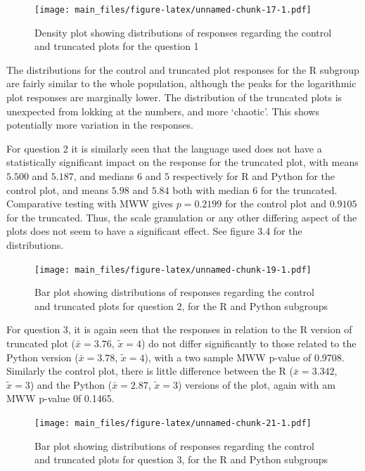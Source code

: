 \documentclass[
  11pt,
]{book}
\begin{document}
\begin{figure}
\centering
\texttt{[image: main\_files/figure-latex/unnamed-chunk-17-1.pdf]}
\caption{Density plot showing distributions of responses regarding the
control and truncated plots for the question 1}
\end{figure}

The distributions for the control and truncated plot responses for the R
subgroup are fairly similar to the whole population, although the peaks
for the logarithmic plot responses are marginally lower. The
distribution of the truncated plots is unexpected from lokking at the
numbers, and more `chaotic'. This shows potentially more variation in
the responses.

For question 2 it is similarly seen that the language used does not have
a statistically significant impact on the response for the truncated
plot, with means \(5.500\) and \(5.187\), and medians \(6\) and \(5\)
respectively for R and Python for the control plot, and means \(5.98\)
and \(5.84\) both with median \(6\) for the truncated. Comparative
testing with MWW gives \(p=0.2199\) for the control plot and \(0.9105\)
for the truncated. Thus, the scale granulation or any other differing
aspect of the plots does not seem to have a significant effect. See
figure 3.4 for the distributions.

\begin{figure}
\centering
\texttt{[image: main\_files/figure-latex/unnamed-chunk-19-1.pdf]}
\caption{Bar plot showing distributions of responses regarding the
control and truncated plots for question 2, for the R and Python
subgroups}
\end{figure}

For question 3, it is again seen that the responses in relation to the R
version of truncated plot (\(\bar{x} = 3.76\), \(\tilde{x} = 4\)) do not
differ significantly to those related to the Python version
(\(\bar{x} = 3.78\), \(\tilde{x} = 4\)), with a two sample MWW p-value
of 0.9708. Similarly the control plot, there is little difference
between the R (\(\bar{x} = 3.342\), \(\tilde{x} = 3\)) and the Python
(\(\bar{x} = 2.87\), \(\tilde{x} = 3\)) versions of the plot, again with
am MWW p-value 0f 0.1465.

\begin{figure}
\centering
\texttt{[image: main\_files/figure-latex/unnamed-chunk-21-1.pdf]}
\caption{Bar plot showing distributions of responses regarding the
control and truncated plots for question 3, for the R and Python
subgroups}
\end{figure}
\end{document}
